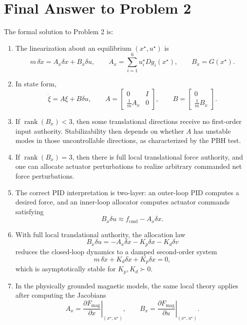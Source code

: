 \documentclass[11pt]{article}
\theoremstyle{definition}
\begin{document}
\section{Final Answer to Problem 2}

The formal solution to Problem 2 is:

\begin{enumerate}[label=\textbf{(\arabic*)},leftmargin=1.6cm]
\item The linearization about an equilibrium $(x^\star,u^\star)$ is
\[
m\,\delta \ddot x = A_x\delta x + B_x\delta u,
\qquad
A_x=\sum_{i=1}^6 u_i^\star Dg_i(x^\star),
\qquad
B_x=G(x^\star).
\]

\item In state form,
\[
\dot\xi=A\xi+B\delta u,
\qquad
A=
\begin{bmatrix}
0&I\\
\frac{1}{m}A_x&0
\end{bmatrix},
\qquad
B=
\begin{bmatrix}
0\\
\frac{1}{m}B_x
\end{bmatrix}.
\]

\item If $\operatorname{rank}(B_x)<3$, then some translational directions receive no first-order input authority. Stabilizability then depends on whether $A$ has unstable modes in those uncontrollable directions, as characterized by the PBH test.

\item If $\operatorname{rank}(B_x)=3$, then there is full local translational force authority, and one can allocate actuator perturbations to realize arbitrary commanded net force perturbations.

\item The correct PID interpretation is two-layer: an outer-loop PID computes a desired force, and an inner-loop allocator computes actuator commands satisfying
\[
B_x\delta u \approx f_{\mathrm{cmd}}-A_x\delta x.
\]

\item With full local translational authority, the allocation law
\[
B_x\delta u=-A_x\delta x-K_p\delta x-K_d\delta v
\]
reduces the closed-loop dynamics to a damped second-order system
\[
m\,\delta \ddot x + K_d\delta \dot x + K_p\delta x = 0,
\]
which is asymptotically stable for $K_p,K_d\succ 0$.

\item In the physically grounded magnetic models, the same local theory applies after computing the Jacobians
\[
A_x=\left.\frac{\partial F_{\mathrm{mag}}}{\partial x}\right|_{(x^\star,u^\star)},
\qquad
B_x=\left.\frac{\partial F_{\mathrm{mag}}}{\partial u}\right|_{(x^\star,u^\star)}.
\]
\end{enumerate}
\end{document}
